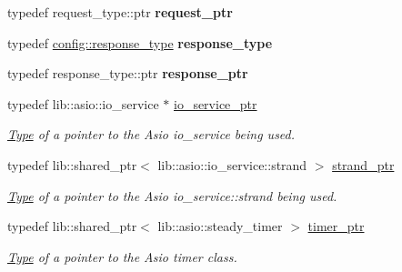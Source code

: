 \begin{DoxyCompactItemize}
\item 
\mbox{\label{classwebsocketpp_1_1transport_1_1asio_1_1connection_a3580e74fb64d30d32f9cac3af47e4954}} 
typedef request\+\_\+type\+::ptr {\bfseries request\+\_\+ptr}
\item 
\mbox{\label{classwebsocketpp_1_1transport_1_1asio_1_1connection_a493602c4469c407f3a94edf71ed9705e}} 
typedef \mbox{\hyperlink{classwebsocketpp_1_1http_1_1parser_1_1response}{config\+::response\+\_\+type}} {\bfseries response\+\_\+type}
\item 
\mbox{\label{classwebsocketpp_1_1transport_1_1asio_1_1connection_a2ff953856756493592411577bb4640d2}} 
typedef response\+\_\+type\+::ptr {\bfseries response\+\_\+ptr}
\item 
\mbox{\label{classwebsocketpp_1_1transport_1_1asio_1_1connection_a8a0bff59326cab2996e414d32f627232}} 
typedef lib\+::asio\+::io\+\_\+service $\ast$ \mbox{\hyperlink{classwebsocketpp_1_1transport_1_1asio_1_1connection_a8a0bff59326cab2996e414d32f627232}{io\+\_\+service\+\_\+ptr}}
\begin{DoxyCompactList}\small\item\em \mbox{\hyperlink{struct_type}{Type}} of a pointer to the Asio io\+\_\+service being used. \end{DoxyCompactList}\item 
\mbox{\label{classwebsocketpp_1_1transport_1_1asio_1_1connection_ad960008bc6449e5c74e041d21a5c05e4}} 
typedef lib\+::shared\+\_\+ptr$<$ lib\+::asio\+::io\+\_\+service\+::strand $>$ \mbox{\hyperlink{classwebsocketpp_1_1transport_1_1asio_1_1connection_ad960008bc6449e5c74e041d21a5c05e4}{strand\+\_\+ptr}}
\begin{DoxyCompactList}\small\item\em \mbox{\hyperlink{struct_type}{Type}} of a pointer to the Asio io\+\_\+service\+::strand being used. \end{DoxyCompactList}\item 
\mbox{\label{classwebsocketpp_1_1transport_1_1asio_1_1connection_a96d8a6cd5cf1120208b206da109a194e}} 
typedef lib\+::shared\+\_\+ptr$<$ lib\+::asio\+::steady\+\_\+timer $>$ \mbox{\hyperlink{classwebsocketpp_1_1transport_1_1asio_1_1connection_a96d8a6cd5cf1120208b206da109a194e}{timer\+\_\+ptr}}
\begin{DoxyCompactList}\small\item\em \mbox{\hyperlink{struct_type}{Type}} of a pointer to the Asio timer class. \end{DoxyCompactList}\end{DoxyCompactItemize}
